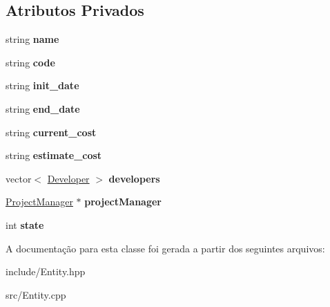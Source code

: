 \subsection*{Atributos Privados}
\begin{DoxyCompactItemize}
\item 
string {\bfseries name}\hypertarget{classProject_a1fa983b923580312b478742d8dd0b065}{}\label{classProject_a1fa983b923580312b478742d8dd0b065}

\item 
string {\bfseries code}\hypertarget{classProject_a023a69fd9e0cfaaf333718f7dbdb518b}{}\label{classProject_a023a69fd9e0cfaaf333718f7dbdb518b}

\item 
string {\bfseries init\+\_\+date}\hypertarget{classProject_a1b75be85fb0968cb1984aba3af419c06}{}\label{classProject_a1b75be85fb0968cb1984aba3af419c06}

\item 
string {\bfseries end\+\_\+date}\hypertarget{classProject_a9f9c60fb7595375b18d41b513d515275}{}\label{classProject_a9f9c60fb7595375b18d41b513d515275}

\item 
string {\bfseries current\+\_\+cost}\hypertarget{classProject_a6437efaca2ed53b48761e4b54037d461}{}\label{classProject_a6437efaca2ed53b48761e4b54037d461}

\item 
string {\bfseries estimate\+\_\+cost}\hypertarget{classProject_ac58ee34023f5e26a00a127aceaaca1eb}{}\label{classProject_ac58ee34023f5e26a00a127aceaaca1eb}

\item 
vector$<$ \hyperlink{classDeveloper}{Developer} $>$ {\bfseries developers}\hypertarget{classProject_a2b4bb6b4b24a3136024dd1514ff61e41}{}\label{classProject_a2b4bb6b4b24a3136024dd1514ff61e41}

\item 
\hyperlink{classProjectManager}{Project\+Manager} $\ast$ {\bfseries project\+Manager}\hypertarget{classProject_a1a542b65cd8658c28bc65a5aa4c0d8df}{}\label{classProject_a1a542b65cd8658c28bc65a5aa4c0d8df}

\item 
int {\bfseries state}\hypertarget{classProject_a726dfef945699070912ab68a70625039}{}\label{classProject_a726dfef945699070912ab68a70625039}

\end{DoxyCompactItemize}


A documentação para esta classe foi gerada a partir dos seguintes arquivos\+:\begin{DoxyCompactItemize}
\item 
include/Entity.\+hpp\item 
src/Entity.\+cpp\end{DoxyCompactItemize}
